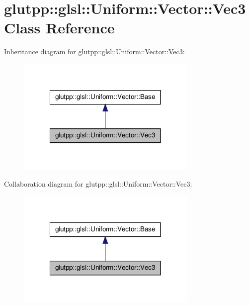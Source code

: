 \hypertarget{classglutpp_1_1glsl_1_1Uniform_1_1Vector_1_1Vec3}{\section{glutpp\-:\-:glsl\-:\-:\-Uniform\-:\-:\-Vector\-:\-:\-Vec3 \-Class \-Reference}
\label{classglutpp_1_1glsl_1_1Uniform_1_1Vector_1_1Vec3}
}


\-Inheritance diagram for glutpp\-:\-:glsl\-:\-:\-Uniform\-:\-:\-Vector\-:\-:\-Vec3\-:\nopagebreak
\begin{figure}[H]
\begin{center}
\leavevmode
\includegraphics[width=246pt]{classglutpp_1_1glsl_1_1Uniform_1_1Vector_1_1Vec3__inherit__graph}
\end{center}
\end{figure}


\-Collaboration diagram for glutpp\-:\-:glsl\-:\-:\-Uniform\-:\-:\-Vector\-:\-:\-Vec3\-:\nopagebreak
\begin{figure}[H]
\begin{center}
\leavevmode
\includegraphics[width=246pt]{classglutpp_1_1glsl_1_1Uniform_1_1Vector_1_1Vec3__coll__graph}
\end{center}
\end{figure}
